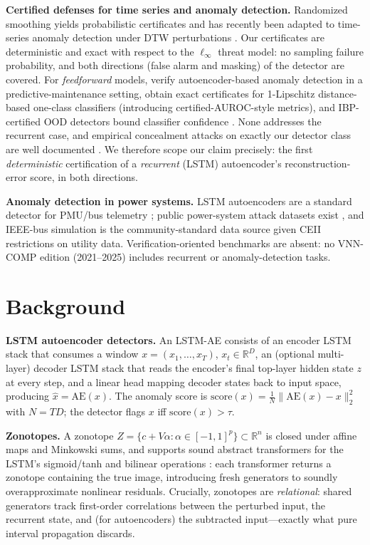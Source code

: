 \documentclass{article} %
\newcommand{\score}{\mathrm{score}}
\begin{document}
\textbf{Certified defenses for time series and anomaly detection.}
Randomized smoothing yields probabilistic certificates and has recently
been adapted to time-series anomaly detection under DTW perturbations
\citep{liu2026dtw}. Our certificates are deterministic and exact with
respect to the $\ell_\infty$ threat model: no sampling failure
probability, and both directions (false alarm and masking) of the
detector are covered. For \emph{feedforward} models,
\citet{guidotti2024ae} verify autoencoder-based anomaly detection in a
predictive-maintenance setting, \citet{bethune2023ocsdf} obtain exact
certificates for 1-Lipschitz distance-based one-class classifiers
(introducing certified-AUROC-style metrics), and IBP-certified OOD
detectors bound classifier confidence \citep{bitterwolf2020good}. None
addresses the recurrent case, and empirical concealment attacks on
exactly our detector class are well documented
\citep{erba2020concealment}. We therefore scope our claim precisely:
the first \emph{deterministic} certification of a \emph{recurrent}
(LSTM) autoencoder's reconstruction-error score, in both directions.

\textbf{Anomaly detection in power systems.} LSTM autoencoders are a
standard detector for PMU/bus telemetry
\citep{malhotra2016lstm,hundman2018detecting}; public power-system
attack datasets exist \citep{adhikari2018power}, and IEEE-bus
simulation is the community-standard data source given CEII
restrictions on utility data. Verification-oriented benchmarks are
absent: no VNN-COMP edition (2021--2025) includes recurrent or
anomaly-detection tasks.

\section{Background}
\label{sec:background}

\textbf{LSTM autoencoder detectors.} An LSTM-AE consists of an encoder
LSTM stack that consumes a window $x = (x_1,\dots,x_T)$,
$x_t \in \mathbb{R}^D$, an (optional multi-layer) decoder LSTM stack
that reads the encoder's final top-layer hidden state $z$ at every step,
and a linear head mapping decoder states back to input space, producing
$\hat{x} = \mathrm{AE}(x)$. The anomaly score is
$\score(x) = \tfrac{1}{N}\lVert \mathrm{AE}(x)-x \rVert_2^2$ with
$N = TD$; the detector flags $x$ iff $\score(x) > \tau$.

\textbf{Zonotopes.} A zonotope
$Z = \{ c + V\alpha : \alpha \in [-1,1]^p \} \subset \mathbb{R}^n$
is closed under affine maps and Minkowski sums, and supports sound
abstract transformers for the LSTM's sigmoid/tanh and bilinear
operations \citep{du2021certrnn}: each transformer returns a zonotope
containing the true image, introducing fresh generators to soundly
overapproximate nonlinear residuals. Crucially, zonotopes are
\emph{relational}: shared generators track first-order correlations
between the perturbed input, the recurrent state, and (for
autoencoders) the subtracted input---exactly what pure interval
propagation discards.
\end{document}
